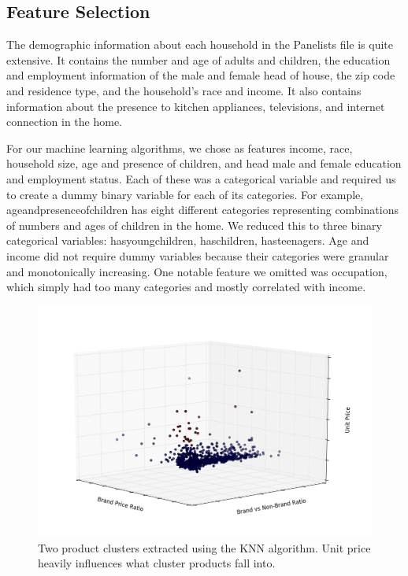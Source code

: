 \documentclass[conference]{IEEEtran}
\begin{document}
\subsection{Feature Selection}

The demographic information about each household in the Panelists file is quite extensive. It contains the number and age of adults and children, the education and employment information of the male and female head of house, the zip code and residence type, and the household's race and income. It also contains information about the presence to kitchen appliances, televisions, and internet connection in the home.
	
	
For our machine learning algorithms, we chose as features income, race, household size, age and presence of children, and head male and female education and employment status. Each of these was a categorical variable and required us to create a dummy binary variable for each of its categories. For example, age\textunderscore and\textunderscore presence\textunderscore of\textunderscore children has eight different categories representing combinations of numbers and ages of children in the home. We reduced this to three binary categorical variables: has\textunderscore young\textunderscore children, has\textunderscore children, has\textunderscore teenagers. Age and income did not require dummy variables because their categories were granular and monotonically increasing. One notable feature we omitted was occupation, which simply had too many categories and mostly correlated with income.

\begin{figure}
\centering
        \includegraphics[totalheight=6cm]{clusters}
    \caption{Two product clusters extracted  using the KNN algorithm. Unit price heavily influences what cluster products fall into.}
    \label{fig:verticalcell}
\end{figure}
\end{document}
